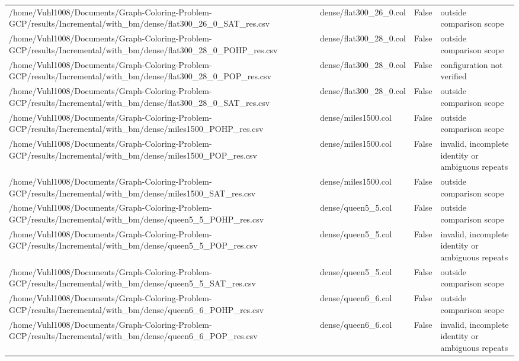 \begin{table}[htbp]
\begin{tabular}{llll}
/home/Vuhl1008/Documents/Graph-Coloring-Problem-GCP/results/Incremental/with\_bm/dense/flat300\_26\_0\_SAT\_res.csv & dense/flat300\_26\_0.col & False & outside comparison scope \\
/home/Vuhl1008/Documents/Graph-Coloring-Problem-GCP/results/Incremental/with\_bm/dense/flat300\_28\_0\_POHP\_res.csv & dense/flat300\_28\_0.col & False & outside comparison scope \\
/home/Vuhl1008/Documents/Graph-Coloring-Problem-GCP/results/Incremental/with\_bm/dense/flat300\_28\_0\_POP\_res.csv & dense/flat300\_28\_0.col & False & configuration not verified \\
/home/Vuhl1008/Documents/Graph-Coloring-Problem-GCP/results/Incremental/with\_bm/dense/flat300\_28\_0\_SAT\_res.csv & dense/flat300\_28\_0.col & False & outside comparison scope \\
/home/Vuhl1008/Documents/Graph-Coloring-Problem-GCP/results/Incremental/with\_bm/dense/miles1500\_POHP\_res.csv & dense/miles1500.col & False & outside comparison scope \\
/home/Vuhl1008/Documents/Graph-Coloring-Problem-GCP/results/Incremental/with\_bm/dense/miles1500\_POP\_res.csv & dense/miles1500.col & False & invalid, incomplete identity or ambiguous repeats \\
/home/Vuhl1008/Documents/Graph-Coloring-Problem-GCP/results/Incremental/with\_bm/dense/miles1500\_SAT\_res.csv & dense/miles1500.col & False & outside comparison scope \\
/home/Vuhl1008/Documents/Graph-Coloring-Problem-GCP/results/Incremental/with\_bm/dense/queen5\_5\_POHP\_res.csv & dense/queen5\_5.col & False & outside comparison scope \\
/home/Vuhl1008/Documents/Graph-Coloring-Problem-GCP/results/Incremental/with\_bm/dense/queen5\_5\_POP\_res.csv & dense/queen5\_5.col & False & invalid, incomplete identity or ambiguous repeats \\
/home/Vuhl1008/Documents/Graph-Coloring-Problem-GCP/results/Incremental/with\_bm/dense/queen5\_5\_SAT\_res.csv & dense/queen5\_5.col & False & outside comparison scope \\
/home/Vuhl1008/Documents/Graph-Coloring-Problem-GCP/results/Incremental/with\_bm/dense/queen6\_6\_POHP\_res.csv & dense/queen6\_6.col & False & outside comparison scope \\
/home/Vuhl1008/Documents/Graph-Coloring-Problem-GCP/results/Incremental/with\_bm/dense/queen6\_6\_POP\_res.csv & dense/queen6\_6.col & False & invalid, incomplete identity or ambiguous repeats \\

\end{tabular}
\end{table}

